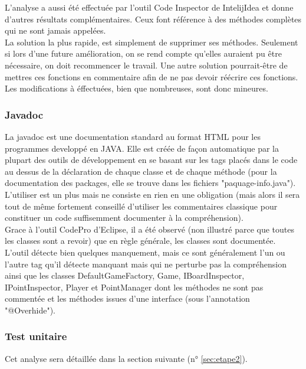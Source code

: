 \documentclass[12pt,a4paper,final]{article}
\begin{document}
L'analyse a aussi été effectuée par l'outil Code Inspector de IntelijIdea et donne d'autres résultats complémentaires. Ceux font référence à des méthodes complètes qui ne sont jamais appelées.\\
La solution la plus rapide, est simplement de supprimer ses méthodes. Seulement si lors d'une future amélioration, on se rend compte qu'elles auraient pu être nécessaire, on doit recommencer le travail. Une autre solution pourrait-être de mettres ces fonctions en commentaire afin de ne pas devoir réécrire ces fonctions.\\
Les modifications à éffectuées, bien que nombreuses, sont donc mineures.


\subsubsection{Javadoc}\label{javadoc}
La javadoc est une documentation standard au format HTML pour les programmes developpé en JAVA. Elle est créée de façon automatique par la plupart des outils de développement en se basant sur les tags placés dans le code au dessus de la déclaration de chaque classe et de chaque méthode (pour la documentation des packages, elle se trouve dans les fichiers "paquage-info.java").
L'utiliser est un plus mais ne consiste en rien en une obligation (mais alors il sera tout de même fortement conseillé d'utiliser les commentaires classique pour constituer un code suffisemment documenter à la compréhension).\\
Grace à l'outil CodePro d'Eclipse, il a été observé (non illustré parce que toutes les classes sont a revoir) que en règle générale, les classes sont documentée. L'outil détecte bien quelques manquement, mais ce sont généralement l'un ou l'autre tag qu'il détecte manquant mais qui ne perturbe pas la compréhension ainsi que les classes DefaultGameFactory, Game, IBoardInspector, IPointInspector, Player et PointManager dont les méthodes ne sont pas commentée et les méthodes issues d'une interface (sous l'annotation "@Overhide").


\subsubsection{Test unitaire}
Cet analyse sera détaillée dans la section suivante (n° \ref{sec:etape2}).
\end{document}
